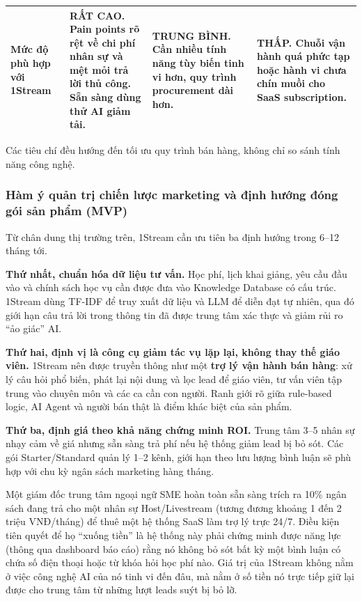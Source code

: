 \begin{table}[H]
\begin{tabularx}{\linewidth}{@{}L{1.6cm}YYY@{}}
        Mức độ phù hợp với 1Stream &
        \textbf{RẤT CAO.} Pain points rõ rệt về chi phí nhân sự và mệt mỏi trả lời thủ công. Sẵn sàng dùng thử AI giảm tải. &
        TRUNG BÌNH. Cần nhiều tính năng tùy biến tinh vi hơn, quy trình procurement dài hơn. &
        THẤP. Chuỗi vận hành quá phức tạp hoặc hành vi chưa chín muồi cho SaaS subscription. \\ \bottomrule
    \end{tabularx}
\end{table}

Các tiêu chí đều hướng đến tối ưu quy trình bán hàng, không chỉ so sánh tính năng công nghệ.


\subsubsection{Hàm ý quản trị chiến lược marketing và định hướng đóng gói sản phẩm (MVP)}

Từ chân dung thị trường trên, 1Stream cần ưu tiên ba định hướng trong 6--12 tháng tới.

\textbf{Thứ nhất, chuẩn hóa dữ liệu tư vấn.} Học phí, lịch khai giảng, yêu cầu đầu vào và chính sách học vụ cần được đưa vào Knowledge Database có cấu trúc. 1Stream dùng TF-IDF để truy xuất dữ liệu và LLM để diễn đạt tự nhiên, qua đó giới hạn câu trả lời trong thông tin đã được trung tâm xác thực và giảm rủi ro ``ảo giác'' AI.

\textbf{Thứ hai, định vị là công cụ giảm tác vụ lặp lại, không thay thế giáo viên.} 1Stream nên được truyền thông như một \textbf{trợ lý vận hành bán hàng}: xử lý câu hỏi phổ biến, phát lại nội dung và lọc lead để giáo viên, tư vấn viên tập trung vào chuyên môn và các ca cần con người. Ranh giới rõ giữa rule-based logic, AI Agent và người bán thật là điểm khác biệt của sản phẩm.

\textbf{Thứ ba, định giá theo khả năng chứng minh ROI.} Trung tâm 3--5 nhân sự nhạy cảm về giá nhưng sẵn sàng trả phí nếu hệ thống giảm lead bị bỏ sót. Các gói Starter/Standard quản lý 1--2 kênh, giới hạn theo lưu lượng bình luận sẽ phù hợp với chu kỳ ngân sách marketing hàng tháng.

\begin{WarningBox}
Một giám đốc trung tâm ngoại ngữ SME hoàn toàn sẵn sàng trích ra 10\% ngân sách đang trả cho một nhân sự Host/Livestream (tương đương khoảng 1 đến 2 triệu VNĐ/tháng) để thuê một hệ thống SaaS làm trợ lý trực 24/7. Điều kiện tiên quyết để họ ``xuống tiền'' là hệ thống này phải chứng minh được năng lực (thông qua dashboard báo cáo) rằng nó không bỏ sót bất kỳ một bình luận có chứa số điện thoại hoặc từ khóa hỏi học phí nào. Giá trị của 1Stream không nằm ở việc công nghệ AI của nó tinh vi đến đâu, mà nằm ở số tiền nó trực tiếp giữ lại được cho trung tâm từ những lượt leads suýt bị bỏ lỡ.
\end{WarningBox}

